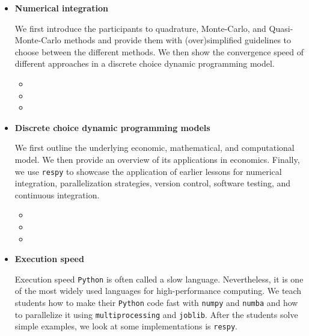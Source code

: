 \begin{itemize}
\item \textbf{Numerical integration}

We first introduce the participants to quadrature, Monte-Carlo, and Quasi-Monte-Carlo methods and provide them with (over)simplified guidelines to choose between the different methods. We then show the convergence speed of different approaches in a discrete choice dynamic programming model.

\begin{itemize}
  \item {}
  \item {}
  \item {}
\end{itemize}

\item \textbf{Discrete choice dynamic programming models}

We first outline the underlying economic, mathematical, and computational model. We then provide an overview of its applications in economics. Finally, we use \verb+respy+ to showcase the application of earlier lessons for numerical integration, parallelization strategies, version control, software testing, and continuous integration.

\begin{itemize}
\item {}
\item {}
\item {}
\end{itemize}

\item \textbf{Execution speed}

Execution speed \verb+Python+ is often called a slow language. Nevertheless, it is one of the most widely used languages for high-performance computing. We teach students how to make their \verb+Python+ code fast with \verb+numpy+ and \verb+numba+ and how to parallelize it using \verb+multiprocessing+ and \verb+joblib+. After the students solve simple examples, we look at some implementations is \verb+respy+.

\end{itemize}




\nocite{Gabler.2019}


